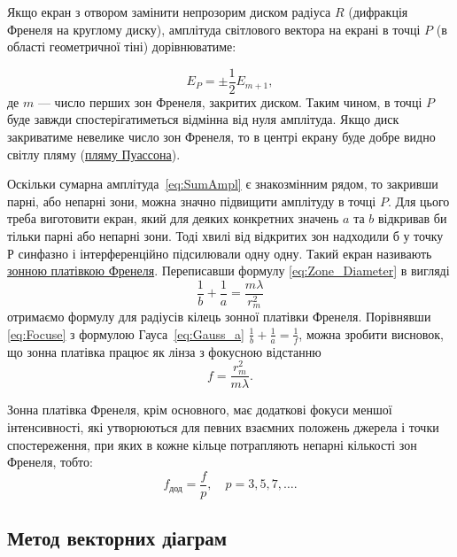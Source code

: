 Якщо екран з отвором замінити непрозорим диском радіуса $R$ (дифракція Френеля на круглому диску), амплітуда світлового вектора на екрані в точці $P$ (в області геометричної тіні) дорівнюватиме:

\begin{equation}\label{eq:Amplitide_of_disk}
    E_P = \pm \frac12 E_{m+1},
\end{equation}
де $ m $ --- число перших зон Френеля, закритих диском.
Таким чином, в точці $P$ буде завжди спостерігатиметься відмінна від нуля амплітуда. Якщо диск закриватиме невелике число зон Френеля, то в центрі екрану буде добре видно світлу пляму (\href{https://www.youtube.com/watch?v=xHHhbR5evq0&ab_channel=InstitutFresnel}{пляму Пуассона}).

Оскільки сумарна амплітуда~\eqref{eq:SumAmpl} є знакозмінним рядом, то закривши парні, або непарні зони, можна значно підвищити амплітуду в точці $P$. Для цього треба виготовити екран, який для деяких конкретних значень $a$ та $b$ відкривав би тільки парні або непарні зони. Тоді хвилі від відкритих зон надходили б у точку $Р$ синфазно і інтерференційно підсилювали одну одну. Такий екран називають \href{https://www.youtube.com/watch?v=aJ4NfUmg16c&ab_channel=mynameismunka2}{зонною платівкою Френеля}. Переписавши формулу \eqref{eq:Zone_Diameter} в вигляді
\begin{equation}\label{eq:Focuse}
    \frac1b+\frac1a=\frac{m\lambda}{r_{m}^{2}}
\end{equation}
отримаємо формулу для радіусів кілець зонної платівки Френеля. Порівнявши \eqref{eq:Focuse} з формулою Гауса~\eqref{eq:Gauss_a} $\frac1b + \frac1a  = \frac1f$, можна зробити висновок, що зонна платівка працює як лінза з фокусною відстанню
\begin{equation}
    f=\frac{r^{2}_{m}}{m\lambda}.
\end{equation}

Зонна платівка Френеля, крім основного, має додаткові фокуси меншої інтенсивності, які утворюються для певних взаємних положень джерела і точки спостереження, при яких в кожне кільце потрапляють непарні кількості зон Френеля, тобто:
\begin{equation*}
    f_\text{дод} = \frac{f}{p}, \quad p =3,5,7,\ldots.
\end{equation*}

\subsection*{Метод векторних діаграм}


